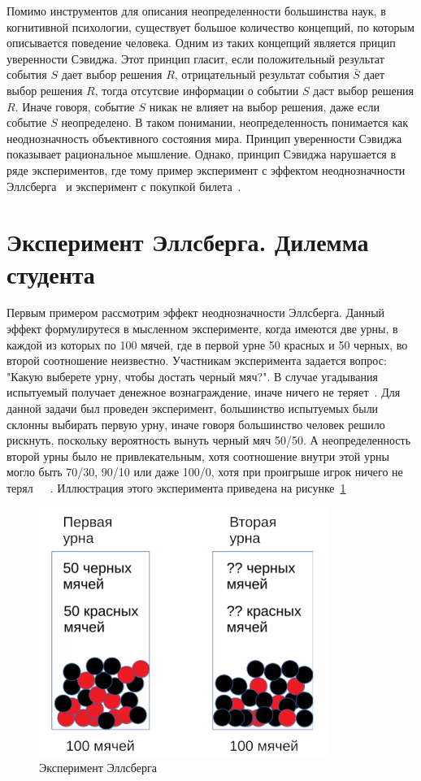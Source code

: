 Помимо инструментов для описания неопределенности большинства наук, в когнитивной психологии, существует большое
количество концепций, по которым описывается поведение человека. Одним из таких концепций
является прицип уверенности Сэвиджа. Этот принцип гласит, если положительный результат события $S$
дает выбор решения $R$, отрицательный результат события $\bar{S}$ дает выбор решения $R$, тогда
отсутсвие информации о событии $S$ даст выбор решения $R$. Иначе говоря, событие $S$ никак
не влияет на выбор решения, даже если событие $S$ неопределено. В таком понимании, неопределенность
понимается как неоднозначность объективного состояния мира. Принцип уверенности Сэвиджа показывает
рациональное мышление. Однако, принцип Сэвиджа нарушается в ряде экспериментов, где тому пример
эксперимент с эффектом неоднозначности Эллсберга~\citep{daniel1961risk} и эксперимент с покупкой
билета~\citep{tversky1992disjunction}.

\section{Эксперимент Эллсберга. Дилемма студента}

Первым примером рассмотрим эффект неоднозначности Эллсберга. Данный эффект формулирутеся
в мысленном эксперименте, когда имеются две урны, в каждой из которых по 100 мячей, где в первой
урне 50 красных и 50 черных, во второй соотношение неизвестно. Участникам эксперимента задается
вопрос: "Какую выберете урну, чтобы достать черный мяч?". В случае угадывания испытуемый получает денежное
вознаграждение, иначе ничего не теряет~\citep{daniel1961risk}. Для данной задачи был проведен эксперимент,
большинство испытуемых были склонны выбирать первую урну, иначе говоря большинство человек решило рискнуть,
поскольку вероятность вынуть черный мяч 50/50. А неопределенность второй урны было не привлекательным,
хотя соотношение внутри этой урны могло быть 70/30, 90/10 или даже 100/0, хотя при проигрыше игрок ничего
не терял~\citep{daniel1961risk}~\citep{dominiak2012dynamic}~\citep{camerer1992recent}. Иллюстрация
этого эксперимента приведена на рисунке~\ref{fig:expmnt_ellsberg}

\begin{figure}[h!]
    \centering
    \includegraphics[width=0.5\linewidth]{pictures/pic_expmnt_ellsberg.png}
    \caption{Эксперимент Эллсберга}
    \label{fig:expmnt_ellsberg}
\end{figure}

